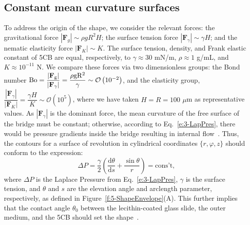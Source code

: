 \subsection{Constant mean curvature surfaces}
To address the origin of the shape, we consider the relevant forces: the gravitational force $|\mathbf{F}_g| \sim \rho g R^2 H$; the surface tension force $|\mathbf{F}_{\gamma}| \sim \gamma H$; and the nematic elasticity force $|\mathbf{F}_K| \sim K$.
The surface tension, density, and Frank elastic constant of 5CB are equal, respectively, to $\gamma \approx 30$ mN/m, $\rho \approx 1$ g/mL, and $K \approx 10^{-11}$ N.
We compare these forces via two dimensionless groups: the Bond number $\rm{Bo} = \dfrac{|\mathbf{F}_g|}{|\mathbf{F}_{\gamma}|} = \dfrac{\rho g R^2}{\gamma} \sim  \mathcal{O}\left (10^{-2} \right)$, and the elasticity group,
 $\dfrac{|\mathbf{F}_{\gamma}|}{|\mathbf{F}_K|} =  \dfrac{\gamma H}{K} \sim \mathcal{O}\left (10^{5} \right )$, where we have taken $H = R = 100$ $\mu$m as representative values.
As $|\mathbf{F}_{\gamma}|$ is the dominant force, the mean curvature of the free surface of the bridge must be constant; otherwise, according to Eq.~\ref{e:3-LapPres}, there would be pressure gradients inside the bridge resulting in internal flow~\cite{RN178}.
Thus, the contours for a surface of revolution in cylindrical coordinates $\{r,\varphi, z\}$ should conform to the expression:
\begin{equation}
  \Delta P = \frac{\gamma}{2} \left ( \frac{\textrm{d}\theta}{\textrm{d}s} + \frac{\sin \theta}{r} \right ) = \textrm{cons't},\label{e:5-ConsMeanCurv}
\end{equation}
where $\Delta P$ is the Laplace Pressure from Eq.~\ref{e:3-LapPres}, $\gamma$ is the surface tension, and $\theta$ and $s$ are the elevation angle and arclength parameter, respectively, as defined in Figure~\ref{f:5-ShapeEnvelope}(A).
This further implies that the contact angle $\theta_0$ between the lecithin-coated glass slide, the outer medium, and the 5CB should set the shape~\cite{RN178}.
